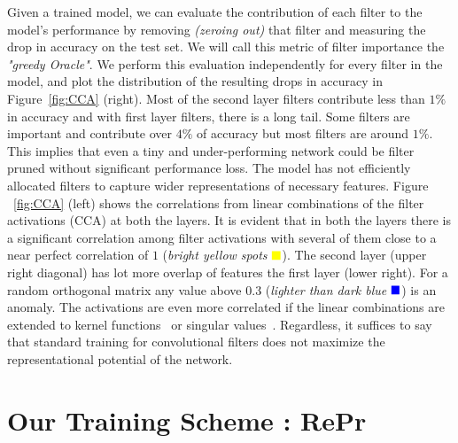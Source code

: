 Given a trained model, we can evaluate the contribution of each filter to the model's performance by removing \textit{(zeroing out)} that filter and measuring the drop in accuracy on the test set.
We will call this metric of filter importance the \emph{"greedy Oracle"}.
We perform this evaluation independently for every filter in the model, and plot the distribution of the resulting drops in accuracy in Figure~\ref{fig:CCA} (right).
Most of the second layer filters contribute less than $1\%$ in accuracy and with first layer filters, there is a long tail. 
Some filters are important and contribute over $4\%$ of accuracy but most filters are around $1\%$. 
This implies that even a tiny and under-performing network could be filter pruned without significant performance loss.
The model has not efficiently allocated filters to capture wider representations of necessary features. 
Figure ~\ref{fig:CCA} (left) shows the correlations from linear combinations of the filter activations (CCA) at both the layers.
It is evident that in both the layers there is a significant correlation among filter activations with several of them close to a near perfect correlation of $1$ (\textit{bright yellow spots} $\color{Yellow} \blacksquare$).  The second layer (upper right diagonal) has lot more overlap of features the first layer (lower right).
For a random orthogonal matrix any value above $0.3$ (\textit{lighter than dark blue} $\color{blue} \blacksquare$) is an anomaly.
The activations are even more correlated if the linear combinations are extended to kernel functions~\cite{Hardoon2004CanonicalCA} or singular values~\cite{Raghu2017SVCCASV}.
Regardless, it suffices to say that standard training for convolutional filters does not maximize the representational potential of the network.


\section{Our Training Scheme : RePr} \label{sec:training}

